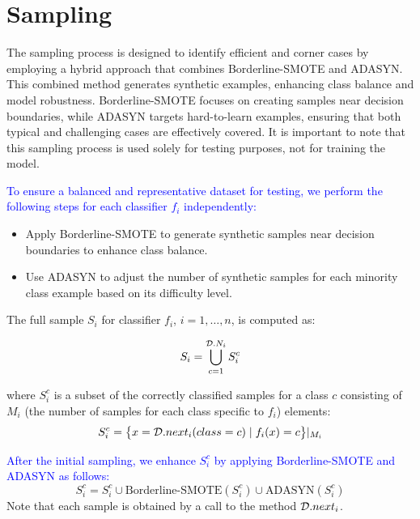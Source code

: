 \section{Sampling}

The sampling process is designed to identify efficient and corner cases by employing a hybrid approach that combines Borderline-SMOTE and ADASYN. This combined method generates synthetic examples, enhancing class balance and model robustness. Borderline-SMOTE focuses on creating samples near decision boundaries, while ADASYN targets hard-to-learn examples, ensuring that both typical and challenging cases are effectively covered. It is important to note that this sampling process is used solely for testing purposes, not for training the model.

\textcolor{blue}{To ensure a balanced and representative dataset for testing, we perform the following steps for each classifier $f_i$ independently:}
\begin{itemize}
    \item Apply Borderline-SMOTE to generate synthetic samples near decision boundaries to enhance class balance.
    \item Use ADASYN to adjust the number of synthetic samples for each minority class example based on its difficulty level.
\end{itemize}

The full sample $S_i$ for classifier $f_i$, $i=1,\dots,n$, is computed as:

\begin{equation}
S_i = \bigcup_{c=1}^{\mathcal{D}.N_i} S_i^c
\end{equation}

where $S_i^c$ is a subset of the correctly classified samples for a class $c$ consisting of $M_i$ (the number of samples for each class specific to $f_i$) elements:
\[S_i^c = \big\{x = \mathcal{D}.next_i(class=c)\mid f_i(x)=c\big\}|_{M_i}\]

\textcolor{blue}{After the initial sampling, we enhance $S_i^c$ by applying Borderline-SMOTE and ADASYN as follows:}
\[
S_i^c = S_i^c \cup \text{Borderline-SMOTE}(S_i^c) \cup \text{ADASYN}(S_i^c)
\]
Note that each sample is obtained by a call to the method $\mathcal{D}.next_i$.


